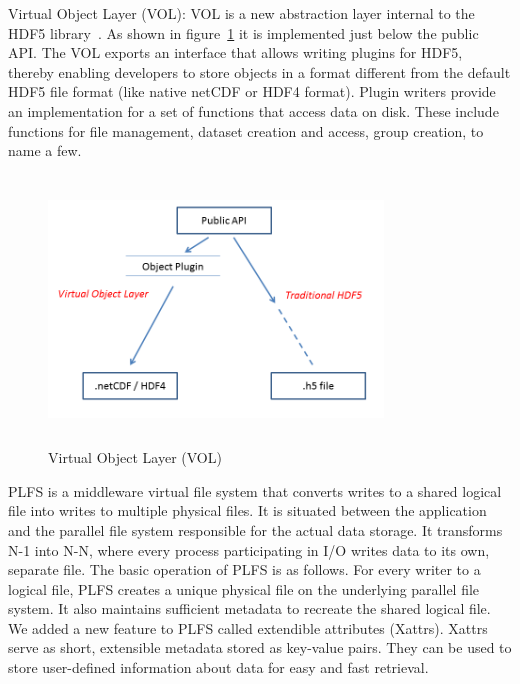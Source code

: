 
Virtual Object Layer (VOL):
VOL is a new abstraction layer internal to the HDF5 library~\cite{vol}. As shown in figure~\ref{hdf5_vol} it is implemented just below the public API. The VOL exports an interface that allows writing plugins for HDF5, thereby enabling developers to store objects in a format different from the default HDF5 file format (like native netCDF or HDF4 format). Plugin writers provide an implementation for a set of functions that access data on disk. These include functions for file management, dataset creation and access, group creation, to name a few.

\begin{figure}[!t]
\centering
\includegraphics[width=3.5in,height=2.8in]{hdf5_vol}
\caption{Virtual Object Layer (VOL)}
\label{hdf5_vol}
\end{figure}

PLFS is a middleware virtual file system that converts writes to a shared logical file into writes to multiple physical files. 
It is situated between the application and the parallel file system responsible for the actual data storage. 
It transforms N-1 into N-N, where every process participating in I/O writes data to its own, separate file. 
The basic operation of PLFS is as follows. For every writer to a logical file, PLFS creates a unique physical file on the underlying parallel file system. 
It also maintains sufficient metadata to recreate the shared logical file. 
We added a new feature to PLFS called extendible attributes (Xattrs). Xattrs serve as short, extensible metadata stored as key-value pairs.
They can be used to store user-defined information about data for easy and fast retrieval. 

